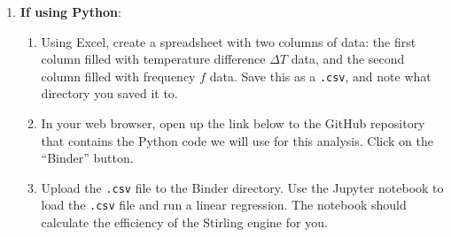 \documentclass{article}
\begin{document}
\begin{enumerate}
\begin{enumerate}
        \item \textbf{If using Python}: 
        \begin{enumerate}
            \item Using Excel, create a spreadsheet with two columns of data: the first column filled with temperature difference $\Delta T$ data, and the second column filled with frequency $f$ data. Save this as a \verb'.csv', and note what directory you saved it to.
            \item In your web browser, open up the link below to the GitHub repository that contains the Python code we will use for this analysis. Click on the ``Binder'' button. 
            \item Upload the \verb'.csv' file to the Binder directory. Use the Jupyter notebook to load the \verb'.csv' file and run a linear regression. The notebook should calculate the efficiency of the Stirling engine for you.
        \end{enumerate}
    \end{enumerate}
\end{enumerate}
\end{document}
